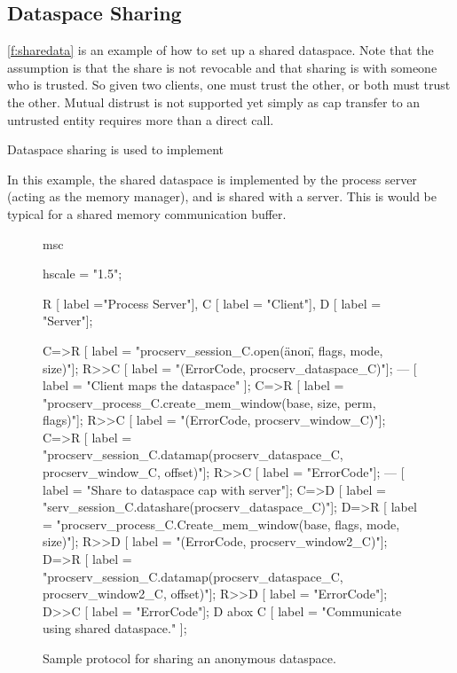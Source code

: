 \subsection{Dataspace Sharing}

\autoref{f:sharedata} is an example of how to set up a shared dataspace. Note that the assumption is
that the share is not revocable and that sharing is with someone who is trusted. So given two
clients, one must trust the other, or both must trust the other. Mutual distrust is not supported
yet simply as cap transfer to an untrusted entity requires more than a direct call.

Dataspace sharing is used to implement 

In this example, the shared dataspace is implemented by the process server (acting as the memory
manager), and is shared with a server. This is would be typical for a shared memory communication
buffer.

\begin{figure}[h]
  \begin{center}
    \begin{msc}
      msc {
        hscale = "1.5";

        R [ label ="Process Server"],
        C [ label = "Client"],
        D [ label = "Server"];
        
        C=>R [ label = "procserv\_session\_C.open(\"anon\", flags, mode, size)"];
        R>>C [ label = "(ErrorCode, procserv\_dataspace\_C)"];
        --- [ label = "Client maps the dataspace" ];
        C=>R [ label = "procserv\_process\_C.create\_mem\_window(base, size, perm, flags)"];
        R>>C [ label = "(ErrorCode, procserv\_window\_C)"];
        C=>R [ label = "procserv\_session\_C.datamap(procserv\_dataspace\_C, procserv\_window\_C, offset)"];
        R>>C [ label = "ErrorCode"];
        --- [ label = "Share to dataspace cap with server"];
        C=>D [ label = "serv\_session\_C.datashare(procserv\_dataspace\_C)"];
        D=>R [ label = "procserv\_process\_C.Create\_mem\_window(base, flags, mode, size)"];
        R>>D [ label = "(ErrorCode, procserv\_window2\_C)"];
        D=>R [ label = "procserv\_session\_C.datamap(procserv\_dataspace\_C, procserv\_window2\_C, offset)"];
        R>>D [ label = "ErrorCode"];
        D>>C [ label = "ErrorCode"];
        D abox C [ label = "Communicate using shared dataspace." ];
      }
    \end{msc}
  \end{center}
  \caption{Sample protocol for sharing an anonymous dataspace.}
  \label{f:sharedata}
\end{figure}

